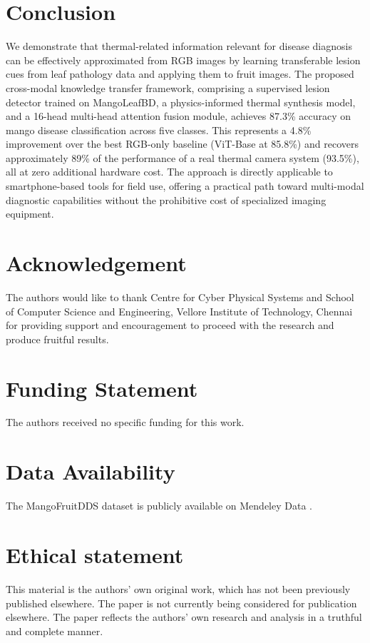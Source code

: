 \documentclass[utf8]{FrontiersinHarvard} %
\begin{document}
\section{Conclusion}
We demonstrate that thermal-related information relevant for disease diagnosis can be effectively approximated from RGB images by learning transferable lesion cues from leaf pathology data and applying them to fruit images. The proposed cross-modal knowledge transfer framework, comprising a supervised lesion detector trained on MangoLeafBD, a physics-informed thermal synthesis model, and a 16-head multi-head attention fusion module, achieves 87.3\% accuracy on mango disease classification across five classes. This represents a 4.8\% improvement over the best RGB-only baseline (ViT-Base at 85.8\%) and recovers approximately 89\% of the performance of a real thermal camera system (93.5\%), all at zero additional hardware cost. The approach is directly applicable to smartphone-based tools for field use, offering a practical path toward multi-modal diagnostic capabilities without the prohibitive cost of specialized imaging equipment.


\section*{Acknowledgement}
The authors would like to thank Centre for Cyber Physical Systems and School of Computer Science and Engineering, Vellore Institute of Technology, Chennai for providing support and encouragement to proceed with the research and produce fruitful results.

\section*{Funding Statement}
The authors received no specific funding for this work.

\section*{Data Availability}
The MangoFruitDDS dataset is publicly available on Mendeley Data \cite{MendeleyDataset}.

\section*{Ethical statement}
This material is the authors' own original work, which has not been previously published elsewhere. The paper is not currently being considered for publication elsewhere. The paper reflects the authors' own research and analysis in a truthful and complete manner.
\end{document}
